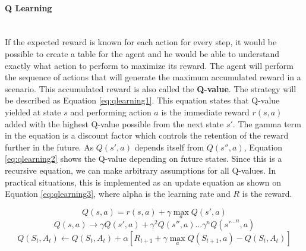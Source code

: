         \paragraph{Q Learning}~\\
        If the expected reward is known for each action for every step, it would be possible to create a table for the agent and he would be able to understand exactly what action to perform to maximize its reward. The agent will perform the sequence of actions that will generate the maximum accumulated reward in a scenario. This accumulated reward is also called the \textbf{Q-value}. The strategy will be described as Equation \ref{eq:qlearning1}. This equation states that Q-value yielded at state $s$ and performing action $a$ is the immediate reward $r(s,a)$ added with the highest Q-value possible from the next state $s'$. The gamma term in the equation is a discount factor which controls the retention of the reward further in the future. As $Q(s',a)$ depends itself from $Q(s'',a)$, Equation \ref{eq:qlearning2} shows the Q-value depending on future states.
        Since this is a recursive equation, we can make arbitrary assumptions for all Q-values. In practical situations, this is implemented as an update equation as shown on Equation \ref{eq:qlearning3}, where alpha is the learning rate and $R$ is the reward.
        
        \begin{equation}
            Q(s,a) = r(s,a) + \gamma \max_{a}Q(s',a)
            \label{eq:qlearning1}
        \end{equation}
        \begin{equation}
            Q(s,a) \rightarrow \gamma Q(s',a) + \gamma^2 Q(s'',a) \dots \gamma^{n} Q(s'^{\dots n}, a)
            \label{eq:qlearning2}
        \end{equation}
        \begin{equation}
            Q(S_t, A_t) \leftarrow Q(S_t, A_t) + \alpha \left[ R_{t+1} + \gamma \max_{a} Q(S_{t+1}, a) - Q(S_t,A_t) \right]
            \label{eq:qlearning3}
        \end{equation}
        
